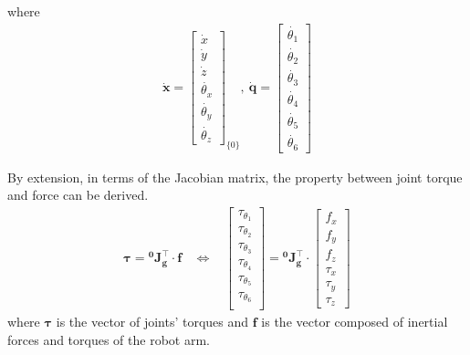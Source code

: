 where
\begin{equation*}
\begin{split}
\boldsymbol{\dot{x}}
=
\begin{bmatrix}
\dot{x}\\
\dot{y}\\
\dot{z}\\
\dot{\theta _x}\\
\dot{\theta _y}\\
\dot{\theta _z}
\end{bmatrix}_{\!\{0\}}
,\ 
\boldsymbol{\dot{q}}
=
\begin{bmatrix}
\dot{\theta _1} \\ 
\dot{\theta _2} \\ 
\dot{\theta _3} \\ 
\dot{\theta _4} \\ 
\dot{\theta _5} \\ 
\dot{\theta _6} 
\end{bmatrix}
\end{split}
\end{equation*}
\par
By extension, in terms of the Jacobian matrix, the property between joint torque and force can be derived.
\begin{equation}
\begin{split}
\boldsymbol{\tau } = \mathbf{^0\!J^\top _g} \cdot \boldsymbol{f}\ \ \ \ 
\Leftrightarrow \ \ \ \ 
\begin{bmatrix}
\tau_{\theta _1} \\ 
\tau_{\theta _2} \\ 
\tau_{\theta _3} \\ 
\tau_{\theta _4} \\ 
\tau_{\theta _5} \\ 
\tau_{\theta _6} \\ 
\end{bmatrix}
=
\mathbf{^0\!J^\top _g} 
\cdot
\begin{bmatrix}
f_x \\ 
f_y \\ 
f_z \\ 
\tau_{x} \\ 
\tau_{y} \\ 
\tau_{z}
\end{bmatrix}
\end{split}
\end{equation}
where $\boldsymbol{\tau }$ is the vector of joints' torques and $\boldsymbol{f}$ is the vector composed of inertial forces and torques of the robot arm.
